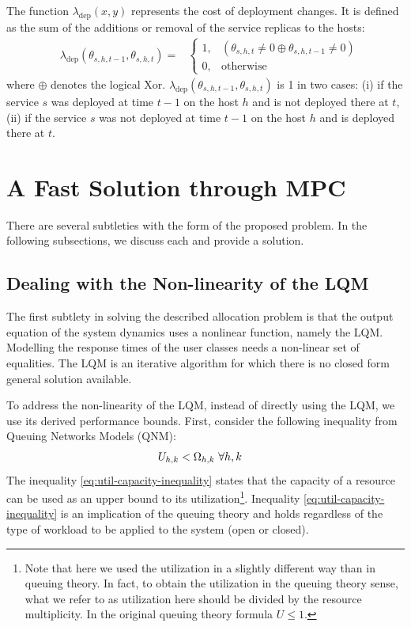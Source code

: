   The function $\lambda_\text{dep}(x,y)$ represents the cost of deployment changes. It is defined as the sum of the additions or removal of the service replicas to the hosts:    
\begin{align}  \label{eq:placement-trashing-cost}
& \lambda_\text{dep}(\theta_{s,h,t-1},\theta_{s,h,t})= 
& \begin{cases} 
1, & (\theta_{s,h,t}\neq0 \oplus \theta_{s,h,t-1}\neq0)  \\ 
0, & \text{otherwise} \end{cases} 
\end{align} 
where $\oplus$ denotes the logical Xor. 
$\lambda_\text{dep}(\theta_{s,h,t-1},\theta_{s,h,t})$ is 1 in two cases: (i) if the service $s$ was deployed at time $t-1$ on the host $h$ and is not deployed there at $t$, (ii) if the service $s$ was not deployed at time $t-1$ on the host $h$ and is deployed there at $t$.


 \section{A Fast Solution through MPC}   
 \label{sec:fast-solution-through-MPC} 
There are several subtleties with the form of the proposed problem. In the following subsections, we discuss each and provide a solution. 
 
\subsection{Dealing with the Non-linearity of the LQM}
The first subtlety in solving the described allocation problem is that the output equation of the system dynamics uses a nonlinear function, namely the LQM. Modelling the response times of the user classes needs a non-linear set of equalities. The LQM is an iterative algorithm for which there is no closed form general solution available.   %

 To address the non-linearity of the LQM, instead of directly using the LQM, we use its derived performance bounds. First, consider the following inequality from Queuing Networks Models (QNM): 
  \begin{align} 
   U_{h,k}  <  \Omega_{h,k}  & \   \forall h,k \label{eq:util-capacity-inequality}
\end{align}
  The inequality \ref{eq:util-capacity-inequality} states that the capacity of a resource can be used as an upper bound to its utilization\footnote{Note that here we used the utilization in a slightly different way than in queuing theory. In fact, to obtain the utilization in the queuing theory sense, what we refer to as utilization here should be divided by the resource multiplicity. In the original queuing theory formula $U\leq 1$.}. Inequality \ref{eq:util-capacity-inequality} is an implication of the queuing theory and holds regardless of the type of workload to be applied to the system (open or closed). 
	
